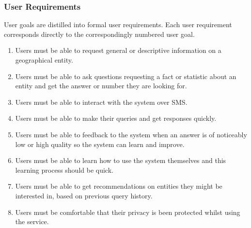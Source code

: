 \documentclass{article}
\begin{document}
\subsubsection{User Requirements}
\label{subsubsec:userRequirements}
User goals are distilled into formal user requirements.  Each user requirement corresponds directly to the correspondingly numbered user goal.
\begin{enumerate}
  \item Users must be able to request general or descriptive information on a geographical entity.
  \item Users must be able to ask questions requesting a fact or statistic about an entity and get the answer or number they are looking for.
  \item Users must be able to interact with the system over SMS.
  \item Users must be able to make their queries and get responses quickly.
  \item Users must be able to feedback to the system when an answer is of noticeably low or high quality so the system can learn and improve.
  \item Users must be able to learn how to use the system themselves and this learning process should be quick.
  \item Users must be able to get recommendations on entities they might be interested in, based on previous query history.
  \item Users must be comfortable that their privacy is been protected whilst using the service.
\end{enumerate}
\end{document}
